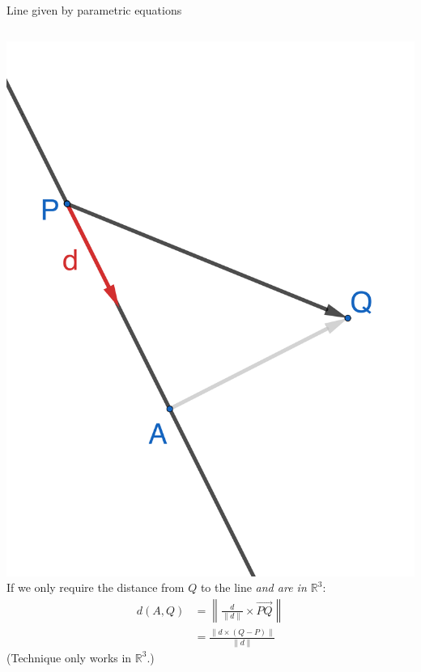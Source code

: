 \documentclass{beamer}
\begin{document}
\begin{frame}{Line given by parametric equations}
    \begin{columns}
        \hspace{-1cm}
        \includegraphics[scale=0.6]{2d-parametric-closest.png}
        If we only require the distance from $Q$ to the line \emph{and are in $\mathbb{R}^3$}:
        \begin{align*}
        d(A, Q)&= \left\|\frac{d}{\|d\|}\times \overrightarrow{PQ}\right\|\\
        &= \frac{\|d\times(Q-P)\|}{\|d\|}
        \end{align*}
        (Technique only works in $\mathbb R^3$.)
    \end{columns}
\end{frame}
\end{document}
